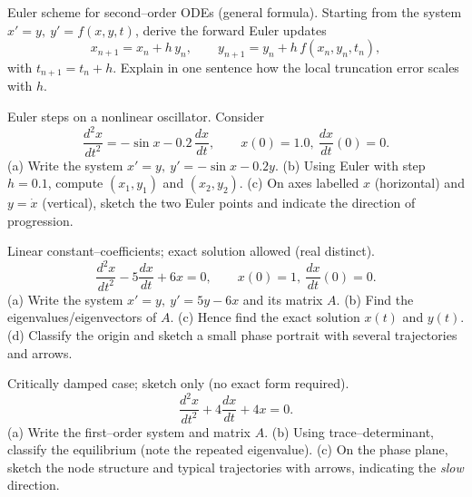 \documentclass[11pt]{article}
\def\textbf#1{#1}%
\newcounter{question}
\begin{document}
\begin{question}
\textbf{Euler scheme for second–order ODEs (general formula).}
Starting from the system \(x'=y,\ y'=f(x,y,t)\), derive the forward Euler updates
\[
x_{n+1}=x_n+h\,y_n,\qquad y_{n+1}=y_n+h\,f(x_n,y_n,t_n),
\]
with \(t_{n+1}=t_n+h\). Explain in one sentence how the local truncation error scales with \(h\).
\end{question}

\begin{question}
\textbf{Euler steps on a nonlinear oscillator.}
Consider
\[
\frac{d^{2}x}{dt^{2}}=-\sin x-0.2\,\frac{dx}{dt},\qquad x(0)=1.0,\ \frac{dx}{dt}(0)=0.
\]
(a) Write the system \(x'=y,\ y'=-\sin x-0.2y\).  
(b) Using Euler with step \(h=0.1\), compute \((x_1,y_1)\) and \((x_2,y_2)\).  
(c) On axes labelled \(x\) (horizontal) and \(y=\dot x\) (vertical), sketch the two Euler points and indicate the direction of progression.
\begin{center}
\end{center}
\end{question}

\begin{question}
\textbf{Linear constant–coefficients; exact solution allowed (real distinct).}
\[
\frac{d^{2}x}{dt^{2}}-5\frac{dx}{dt}+6x=0,\qquad x(0)=1,\ \frac{dx}{dt}(0)=0.
\]
(a) Write the system \(x'=y,\ y'=5y-6x\) and its matrix \(A\).  
(b) Find the eigenvalues/eigenvectors of \(A\).  
(c) Hence find the exact solution \(x(t)\) and \(y(t)\).  
(d) Classify the origin and sketch a small phase portrait with several trajectories and arrows.
\end{question}

\begin{question}
\textbf{Critically damped case; sketch only (no exact form required).}
\[
\frac{d^{2}x}{dt^{2}}+4\frac{dx}{dt}+4x=0.
\]
(a) Write the first–order system and matrix \(A\).  
(b) Using trace–determinant, classify the equilibrium (note the repeated eigenvalue).  
(c) On the phase plane, sketch the node structure and typical trajectories with arrows, indicating the \emph{slow} direction.
\begin{center}
\end{center}
\end{question}
\end{document}
